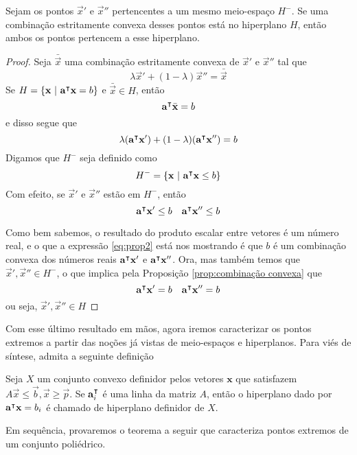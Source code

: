 \begin{prop:hiperplano e ponto extremo}
	\label{prop:hiperplano e ponto extremo}
	Sejam os pontos $\vec{x}'$ e $\vec{x}''$ pertencentes a um mesmo
	meio-espaço $H^-$. Se uma combinação estritamente convexa desses pontos
	está no hiperplano $H$, então ambos os pontos pertencem a esse hiperplano.

	\begin{proof}
		Seja $\bar{\vec{x}}$ uma combinação estritamente convexa de $\vec{x}'$ e $\vec{x}''$ tal que
		\[\lambda \vec{x}' + (1 - \lambda) \vec{x}'' = 		\bar{\vec{x}}\]
		Se $H = \{\mathbf{x}\ |\ \mathbf{a}^\intercal\mathbf{x} = b\}$ e $\bar{\vec{x}} \in H$, então
		\[\mathbf{a}^\intercal\bar{\mathbf{x}} = b\]
		e disso segue que
		\begin{equation}
			\label{eq:prop2}
			\lambda (\mathbf{a}^\intercal\mathbf{x}') + (1 - \lambda) 	(\mathbf{a}^\intercal\mathbf{x}'') = b
		\end{equation}
		Digamos que $H^-$ seja definido como
		\[H^- = \{\vec{x}\ |\ \transp{a}\vec{x} \leq b\}\]
		Com efeito, se $\vec{x}'$ e $\vec{x}''$ estão em $H^-$, então
		\[\mathbf{a}^\intercal\mathbf{x}' \leq b \quad \mathbf{a}^\intercal\mathbf{x}'' \leq b\]


		Como bem sabemos, o resultado do produto escalar entre vetores é um
		número real, e o que a expressão \ref{eq:prop2} está nos mostrando é
		que $b$ é um combinação convexa dos números reais $\mathbf{a}^\intercal\mathbf{x}'$
		e $\mathbf{a}^\intercal\mathbf{x}''$. Ora, mas também temos que
		$\vec{x}', \vec{x}'' \in H^-$, o que implica pela Proposição
		\ref*{prop:combinação convexa} que
		\[\mathbf{a}^\intercal\mathbf{x}' = b \quad \mathbf{a}^\intercal\mathbf{x}'' = b\]
		ou seja, $\vec{x}', \vec{x}'' \in H$
	\end{proof}
\end{prop:hiperplano e ponto extremo}

Com esse último resultado em mãos, agora iremos caracterizar os pontos extremos
a partir das noções já vistas de meio-espaços e hiperplanos. Para viés de
síntese, admita a seguinte definição

\begin{def:hiperplano definidor}
  Seja $X$ um conjunto convexo definidor pelos vetores $\mathbf x$ que
  satisfazem $A \vec x \leq \vec b, \vec x \geq \vec p$. Se
  $\mathbf{a}^\intercal_i$ é uma linha da matriz $A$, então o hiperplano
  dado por $\mathbf{a}^\intercal \mathbf x = b_i$ é chamado de hiperplano
  definidor de $X$.
\end{def:hiperplano definidor}

Em sequência, provaremos o teorema a seguir que caracteriza pontos
extremos de um conjunto poliédrico.

